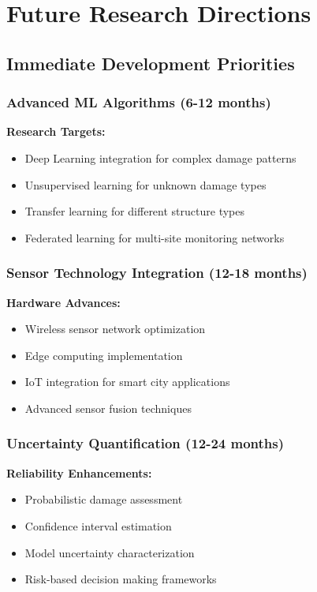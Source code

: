 \documentclass[12pt,a4paper]{article}
\begin{document}
\section{Future Research Directions}

\subsection{Immediate Development Priorities}

\subsubsection{Advanced ML Algorithms (6-12 months)}

\textbf{Research Targets:}
\begin{itemize}
    \item Deep Learning integration for complex damage patterns
    \item Unsupervised learning for unknown damage types
    \item Transfer learning for different structure types
    \item Federated learning for multi-site monitoring networks
\end{itemize}

\subsubsection{Sensor Technology Integration (12-18 months)}

\textbf{Hardware Advances:}
\begin{itemize}
    \item Wireless sensor network optimization
    \item Edge computing implementation
    \item IoT integration for smart city applications
    \item Advanced sensor fusion techniques
\end{itemize}

\subsubsection{Uncertainty Quantification (12-24 months)}

\textbf{Reliability Enhancements:}
\begin{itemize}
    \item Probabilistic damage assessment
    \item Confidence interval estimation
    \item Model uncertainty characterization
    \item Risk-based decision making frameworks
\end{itemize}
\end{document}
